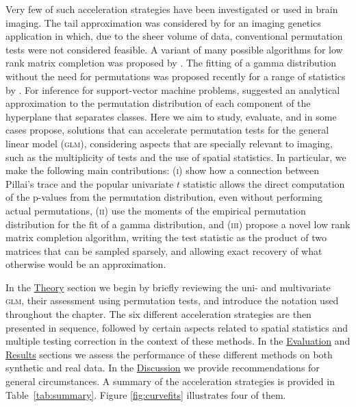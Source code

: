 Very few of such acceleration strategies have been investigated or used in brain imaging. The tail approximation was considered by \citet{Ge2012} for an imaging genetics application in which, due to the sheer volume of data, conventional permutation tests were not considered feasible. A variant of many possible algorithms for low rank matrix completion was proposed by \citet{Hinrichs2013}. The fitting of a gamma distribution without the need for permutations was proposed recently for a range of statistics by \citet{Minas2014}. For inference for support-vector machine problems, \citet{Gaonkar2012} suggested an analytical approximation to the permutation distribution of each component of the hyperplane that separates classes. Here we aim to study, evaluate, and in some cases propose, solutions that can accelerate permutation tests for the general linear model (\textsc{glm}), considering aspects that are specially relevant to imaging, such as the multiplicity of tests and the use of spatial statistics. In particular, we make the following main contributions: (\textsc{i}) show how a connection between Pillai's trace and the popular univariate $t$ statistic allows the direct computation of the p-values from the permutation distribution, even without performing actual permutations, (\textsc{ii}) use the moments of the empirical permutation distribution for the fit of a gamma distribution, and (\textsc{iii}) propose a novel low rank matrix completion algorithm, writing the test statistic as the product of two matrices that can be sampled sparsely, and allowing exact recovery of what otherwise would be an approximation.

In the \href{sec:accel:theory}{Theory} section we begin by briefly reviewing the uni- and multivariate \textsc{glm}, their assessment using permutation tests, and introduce the notation used throughout the chapter. The six different acceleration strategies are then presented in sequence, followed by certain aspects related to spatial statistics and multiple testing correction in the context of these methods. In the \href{sec:accel:evaluation}{Evaluation} and \href{sec:accel:results}{Results} sections we assess the performance of these different methods on both synthetic and real data. In the \href{sec:accel:discussion}{Discussion} we provide recommendations for general circumstances. A summary of the acceleration strategies is provided in Table~\ref{tab:summary}. Figure \ref{fig:curvefits} illustrates four of them.

